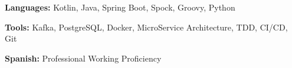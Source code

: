 \documentclass[letterpaper,11pt]{article}
\begin{document}
\begin{myitemize}

\item \textbf{Languages: }{\normalsize Kotlin, Java, Spring Boot, Spock, Groovy, Python}
\item \textbf{Tools: } {\normalsize Kafka, PostgreSQL, Docker, MicroService Architecture, TDD, CI/CD, Git}
\item \textbf{Spanish: } {\normalsize Professional Working Proficiency}

  \begin{comment}
  \item \textbf{Languages: }{\normalsize Java, C/C++, Bash, \LaTeX, PHP, Python, JavaScript, Visual Basic, HTML}
  \item \textbf{Tools: } {\normalsize Vi/Vim, Git, GNU Make, JUnit, SVN, Linux, Windows, Mac OSX, GDB}
  \item \textbf{Spanish: } {\normalsize Professional Working Proficiency}
 \end{comment}
    \begin{comment}
  \item[Proficient:] {\normalsize
      Spanish, Java, LISP, Bash, Git, Vi/Vim, Windows XP/7/8/10, Debian
    }
  \item[Familiar With:] {\normalsize
      C/C++, \LaTeX, Mac OSX,
    }
  \item[Exposure To:]{\normalsize
    C\#, Visual Basic, PostgreSQL, GDB, HTML
  }
    \end{comment}
\end{myitemize}


\end{document}
